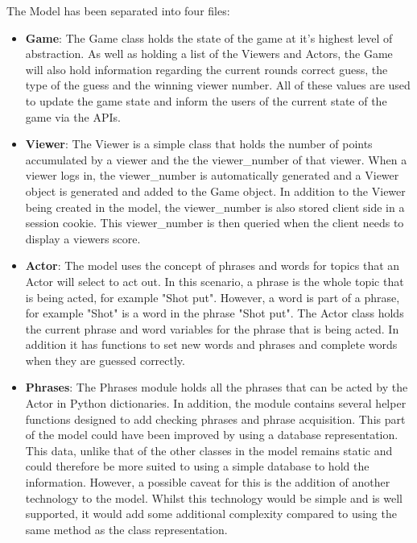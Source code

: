 The Model has been separated into four files:
\begin{itemize}
	\item \textbf{Game}: The Game class holds the state of the game at it's highest level of abstraction. As well as holding a list of the Viewers and Actors, the Game will also hold information regarding the current rounds correct guess, the type of the guess and the winning viewer number. All of these values are used to update the game state and inform the users of the current state of the game via the APIs.
	
	\item \textbf{Viewer}: The Viewer is a simple class that holds the number of points accumulated by a viewer and the the viewer\_number of that viewer. When a viewer logs in, the viewer\_number is automatically generated and a Viewer object is generated and added to the Game object. In addition to the Viewer being created in the model, the viewer\_number is also stored client side in a session cookie. This viewer\_number is then queried when the client needs to display a viewers score. 
	
	\item \textbf{Actor}: The model uses the concept of phrases and words for topics that an Actor will select to act out. In this scenario, a phrase is the whole topic that is being acted, for example "Shot put". However, a word is part of a phrase, for example "Shot" is a word in the phrase "Shot put". The Actor class holds the current phrase and word variables for the phrase that is being acted. In addition it has functions to set new words and phrases and complete words when they are guessed correctly.
	
	\item \textbf{Phrases}: The Phrases module holds all the phrases that can be acted by the Actor in Python dictionaries. In addition, the module contains several helper functions designed to add checking phrases and phrase acquisition. This part of the model could have been improved by using a database representation. This data, unlike that of the other classes in the model remains static and could therefore be more suited to using a simple database to hold the information. However, a possible caveat for this is the addition of another technology to the model. Whilst this technology would be simple and is well supported, it would add some additional complexity compared to using the same method as the class representation.
	
\end{itemize}


